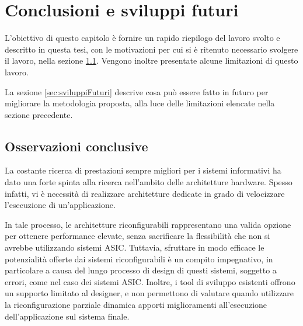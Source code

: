 \chapter{Conclusioni e sviluppi futuri}
\label{chap:conclusioni}
\vspace{1cm}
L'obiettivo di questo capitolo \`e fornire un rapido riepilogo del lavoro svolto
e descritto in questa tesi, con le motivazioni per cui si \`e ritenuto necessario
svolgere il lavoro, nella sezione \ref{sec:osservazioniConclusiveCap7}. Vengono inoltre
presentate alcune limitazioni di questo lavoro.

La sezione \ref{sec:sviluppiFuturi} descrive cosa pu\`o essere fatto in futuro
per migliorare la metodologia proposta, alla luce delle limitazioni elencate
nella sezione precedente.

\newpage


\section{Osservazioni conclusive}
\label{sec:osservazioniConclusiveCap7}
La costante ricerca di prestazioni sempre migliori per i sistemi informativi
ha dato una forte spinta alla ricerca nell'ambito delle architetture hardware.
Spesso infatti, vi \`e necessit\`a di realizzare architetture dedicate in grado di
velocizzare l'esecuzione di un'applicazione.

In tale processo, le architetture riconfigurabili rappresentano una valida opzione
per ottenere performance elevate, senza sacrificare la flessibilit\`a che non si avrebbe
utilizzando sistemi \ac{ASIC}. Tuttavia, sfruttare in modo efficace le potenzialit\`a
offerte dai sistemi riconfigurabili \`e un compito impegnativo, in particolare a causa
del lungo processo di design di questi sistemi, soggetto a errori, come nel caso dei sistemi
\ac{ASIC}.
Inoltre, i tool di sviluppo esistenti offrono un supporto limitato al designer, e non permettono
di valutare quando utilizzare la riconfigurazione parziale dinamica apporti miglioramenti
all'esecuzione dell'applicazione sul sistema finale.

